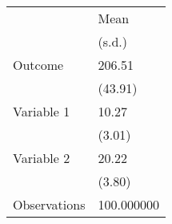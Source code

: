 \begin{tabular}{ll}
\toprule
 & Mean \\
 & (s.d.) \\
\midrule
Outcome & 206.51 \\
  & (43.91) \\
Variable 1 & 10.27 \\
  & (3.01) \\
Variable 2 & 20.22 \\
  & (3.80) \\
Observations & 100.000000 \\
\bottomrule
\end{tabular}
